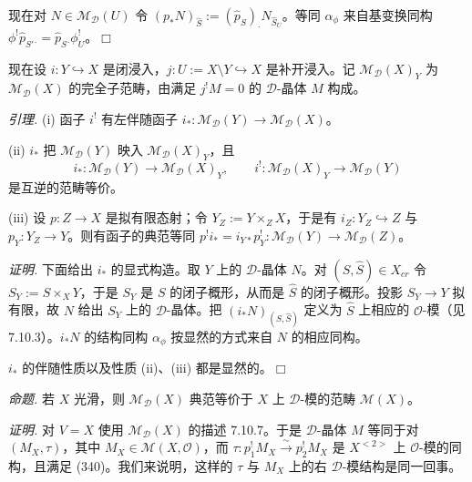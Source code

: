 现在对 $N\in\mathcal{M}_{\mathcal{D}}(U)$ 令 $(p_{*}N)_{\hat S}:=(\hat p_{S})_{\cdot}N_{\hat S_{U}}$。等同 $\alpha_{\phi}$ 来自基变换同构 $\phi^{!}\hat p_{S'}{}_{\cdot}=\hat p_{S}{}_{\cdot}\phi^{!}_{U}$。\hfill$\Box$

现在设 $i:Y\hookrightarrow X$ 是闭浸入，$j:U:=X\setminus Y\hookrightarrow X$ 是补开浸入。记 $\mathcal{M}_{\mathcal{D}}(X)_{Y}$ 为 $\mathcal{M}_{\mathcal{D}}(X)$ 的完全子范畴，由满足 $j^{!}M=0$ 的 $\mathcal{D}$-晶体 $M$ 构成。

 \emph{引理.} (i) 函子 $i^{!}$ 有左伴随函子 $i_{*}:\mathcal{M}_{\mathcal{D}}(Y)\to\mathcal{M}_{\mathcal{D}}(X)$。

(ii) $i_{*}$ 把 $\mathcal{M}_{\mathcal{D}}(Y)$ 映入 $\mathcal{M}_{\mathcal{D}}(X)_{Y}$，且
\[
i_{*}:\mathcal{M}_{\mathcal{D}}(Y)\to\mathcal{M}_{\mathcal{D}}(X)_{Y},\qquad i^{!}:\mathcal{M}_{\mathcal{D}}(X)_{Y}\to\mathcal{M}_{\mathcal{D}}(Y)
\]
是互逆的范畴等价。

(iii) 设 $p:Z\to X$ 是拟有限态射；令 $Y_{Z}:=Y\times_{Z}X$，于是有 $i_{Z}:Y_{Z}\hookrightarrow Z$ 与 $p_{Y}:Y_{Z}\to Y$。则有函子的典范等同 $p^{!}i_{*}=i_{Y*}p^{!}_{Y}:\mathcal{M}_{\mathcal{D}}(Y)\to\mathcal{M}_{\mathcal{D}}(Z)$。

\emph{证明.} 下面给出 $i_{*}$ 的显式构造。取 $Y$ 上的 $\mathcal{D}$-晶体 $N$。对 $(S,\hat S)\in X_{cr}$ 令 $S_{Y}:=S\times_{X}Y$，于是 $S_{Y}$ 是 $S$ 的闭子概形，从而是 $\hat S$ 的闭子概形。投影 $S_{Y}\to Y$ 拟有限，故 $N$ 给出 $S_{Y}$ 上的 $\mathcal{D}$-晶体。把 $(i_{*}N)_{(S,\hat S)}$ 定义为 $\hat S$ 上相应的 $\mathcal{O}$-模（见 7.10.3）。$i_{*}N$ 的结构同构 $\alpha_{\phi}$ 按显然的方式来自 $N$ 的相应同构。

$i_{*}$ 的伴随性质以及性质 (ii)、(iii) 都是显然的。\hfill$\Box$

 \emph{命题.} 若 $X$ 光滑，则 $\mathcal{M}_{\mathcal{D}}(X)$ 典范等价于 $X$ 上 $\mathcal{D}$-模的范畴 $\mathcal{M}(X)$。

\emph{证明.} 对 $V=X$ 使用 $\mathcal{M}_{\mathcal{D}}(X)$ 的描述 7.10.7。于是 $\mathcal{D}$-晶体 $M$ 等同于对 $(M_{X},\tau)$，其中 $M_{X}\in\mathcal{M}(X,\mathcal{O})$，而 $\tau:p^{!}_{1}M_{X}\xrightarrow{\sim}p^{!}_{2}M_{X}$ 是 $X^{<2>}$ 上 $\mathcal{O}$-模的同构，且满足 (340)。我们来说明，这样的 $\tau$ 与 $M_{X}$ 上的右 $\mathcal{D}$-模结构是同一回事。

